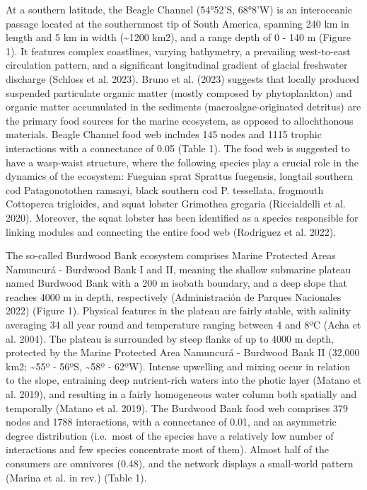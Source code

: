 \documentclass[
]{article}
\begin{document}
At a southern latitude, the Beagle Channel (54°52'S, 68°8'W) is an
interoceanic passage located at the southernmost tip of South America,
spanning 240 km in length and 5 km in width (\textasciitilde1200 km2),
and a range depth of 0 - 140 m (Figure 1). It features complex
coastlines, varying bathymetry, a prevailing west-to-east circulation
pattern, and a significant longitudinal gradient of glacial freshwater
discharge (Schloss et al. 2023). Bruno et al. (2023) suggests that
locally produced suspended particulate organic matter (mostly composed
by phytoplankton) and organic matter accumulated in the sediments
(macroalgae-originated detritus) are the primary food sources for the
marine ecosystem, as opposed to allochthonous materials. Beagle Channel
food web includes 145 nodes and 1115 trophic interactions with a
connectance of 0.05 (Table 1). The food web is suggested to have a
wasp-waist structure, where the following species play a crucial role in
the dynamics of the ecosystem: Fueguian sprat Sprattus fuegensis,
longtail southern cod Patagonotothen ramsayi, black southern cod P.
tessellata, frogmouth Cottoperca trigloides, and squat lobster Grimothea
gregaria (Riccialdelli et al. 2020). Moreover, the squat lobster has
been identified as a species responsible for linking modules and
connecting the entire food web (Rodriguez et al. 2022).

The so-called Burdwood Bank ecosystem comprises Marine Protected Areas
Namuncurá - Burdwood Bank I and II, meaning the shallow submarine
plateau named Burdwood Bank with a 200 m isobath boundary, and a deep
slope that reaches 4000 m in depth, respectively (Administración de
Parques Nacionales 2022) (Figure 1). Physical features in the plateau
are fairly stable, with salinity averaging 34 all year round and
temperature ranging between 4 and 8ºC (Acha et al. 2004). The plateau is
surrounded by steep flanks of up to 4000 m depth, protected by the
Marine Protected Area Namuncurá - Burdwood Bank II (32,000 km2;
\textasciitilde55º - 56ºS, \textasciitilde58º - 62ºW). Intense upwelling
and mixing occur in relation to the slope, entraining deep nutrient-rich
waters into the photic layer (Matano et al. 2019), and resulting in a
fairly homogeneous water column both spatially and temporally (Matano et
al. 2019). The Burdwood Bank food web comprises 379 nodes and 1788
interactions, with a connectance of 0.01, and an asymmetric degree
distribution (i.e.~most of the species have a relatively low number of
interactions and few species concentrate most of them). Almost half of
the consumers are omnivores (0.48), and the network displays a
small-world pattern (Marina et al. in rev.) (Table 1).
\end{document}
